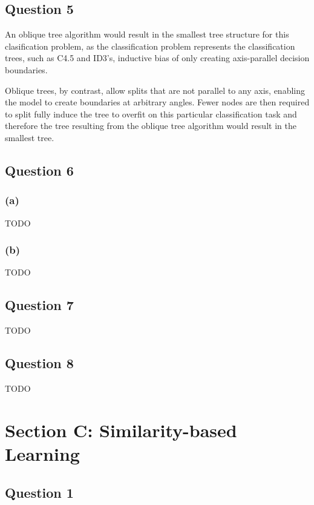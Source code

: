 \documentclass[10pt]{article}
\begin{document}
\subsection*{Question 5}

An oblique tree algorithm would result in the smallest tree structure for this clasification problem,
as the classification problem represents the classification trees, such as C4.5 and ID3's, inductive bias
of only creating axis-parallel decision boundaries.

Oblique trees, by contrast, allow splits that are not parallel to any axis, enabling the model to create
boundaries at arbitrary angles. Fewer nodes are then required to split fully induce the tree to overfit
on this particular classification task and therefore the tree resulting from the oblique
tree algorithm would result in the smallest tree.

\subsection*{Question 6}

\subsubsection*{(a)}

TODO

\subsubsection*{(b)}

TODO

\subsection*{Question 7}

TODO

\subsection*{Question 8}

TODO

\section*{Section C: Similarity-based Learning}

\subsection*{Question 1}
\end{document}

